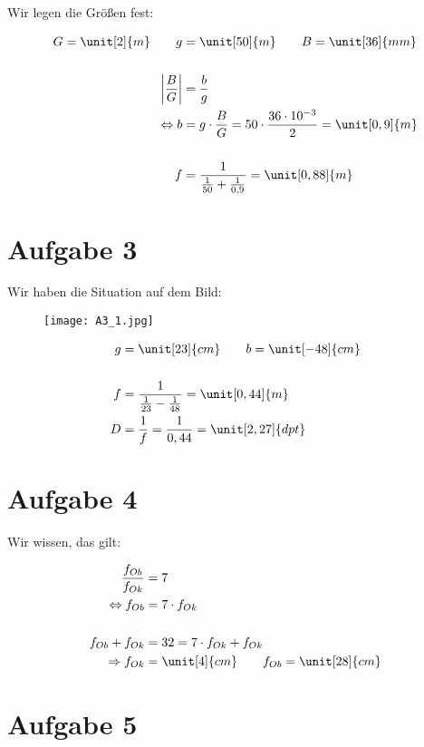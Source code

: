 Wir legen die Größen fest:

\begin{align*}
G = \unit[2]{m} \qquad g &= \unit[50]{m} \qquad B = \unit[36]{mm} \\
\hfill \\
\left| \frac{B}{G} \right| &= \frac{b}{g} \\
\Leftrightarrow b &= g \cdot \frac{B}{G} = 50 \cdot \frac{36 \cdot 10^{-3}}{2} = \unit[0,9]{m} \\
\hfill \\
f &= \frac{1}{\frac{1}{50} + \frac{1}{0,9}} = \unit[0,88]{m}
\end{align*}


\newpage

\section{Aufgabe 3}

Wir haben die Situation auf dem Bild:

\begin{figure}[h]
	\centering
	\texttt{[image: A3\_1.jpg]}
\end{figure}


\begin{align*}
g &= \unit[23]{cm} \qquad b = \unit[-48]{cm} \\
\hfill \\
f &= \frac{1}{\frac{1}{23} - \frac{1}{48}} = \unit[0,44]{m} \\
D &= \frac{1}{f} = \frac{1}{0,44} = \unit[2,27]{dpt}
\end{align*}


\section{Aufgabe 4}

Wir wissen, das gilt:

\begin{align*}
\frac{f_{Ob}}{f_{Ok}} &= 7 \\
\Leftrightarrow f_{Ob} &= 7 \cdot f_{Ok} \\
\hfill \\
f_{Ob} + f_{Ok} &= 32 = 7 \cdot f_{Ok} + f_{Ok} \\
\Rightarrow f_{Ok} &= \unit[4]{cm} \qquad f_{Ob} = \unit[28]{cm}
\end{align*}

\newpage

\section{Aufgabe 5}

